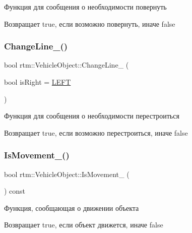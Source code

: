 Функция для сообщения о необходимости повернуть \begin{DoxyReturn}{Возвращает}
true, если возможно повернуть, иначе false 
\end{DoxyReturn}
\mbox{\label{classrtm_1_1_vehicle_object_a73ef7c4f1318bdbe2cd75dc4f07aca4e}} 
\subsubsection{\texorpdfstring{Change\+Line\+\_\+()}{ChangeLine\_()}}
{\footnotesize\ttfamily bool rtm\+::\+Vehicle\+Object\+::\+Change\+Line\+\_\+ (\begin{DoxyParamCaption}\item[{bool}]{is\+Right = {\ttfamily \hyperlink{namespacertm_a92d29773a54951290dd89f754fb39a8c}{L\+E\+FT}} }\end{DoxyParamCaption})\hspace{0.3cm}{\ttfamily [protected]}}

Функция для сообщения о необходимости перестроиться \begin{DoxyReturn}{Возвращает}
true, если возможно перестроиться, иначе false 
\end{DoxyReturn}
\mbox{\label{classrtm_1_1_vehicle_object_adcccb796e4b1b404a25512fa8491cd43}} 
\subsubsection{\texorpdfstring{Is\+Movement\+\_\+()}{IsMovement\_()}}
{\footnotesize\ttfamily bool rtm\+::\+Vehicle\+Object\+::\+Is\+Movement\+\_\+ (\begin{DoxyParamCaption}{ }\end{DoxyParamCaption}) const\hspace{0.3cm}{\ttfamily [protected]}}

Функция, сообщающая о движении объекта \begin{DoxyReturn}{Возвращает}
true, если объект движется, иначе false 
\end{DoxyReturn}
\mbox{\label{classrtm_1_1_vehicle_object_a7cb07a20e09d1460ec3d2dd70d62aba2}} 
